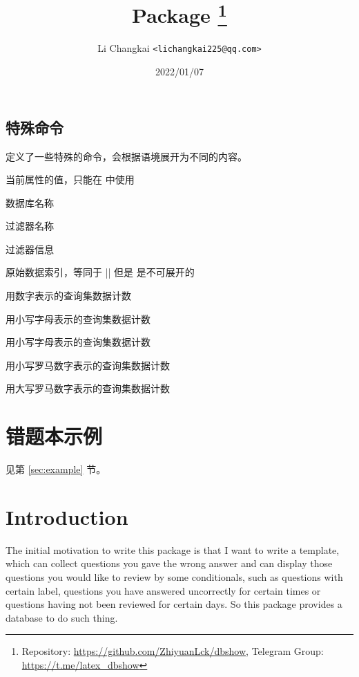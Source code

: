 \documentclass[full]{l3doc}
\begin{document}
\begin{documentation}
\subsection{特殊命令}

 定义了一些特殊的命令，会根据语境展开为不同的内容。

\DescribeMacro{\dbval}当前属性的值，只能在  中使用

\DescribeMacro{\dbDatabase}数据库名称

\DescribeMacro{\dbFilterName}过滤器名称

\DescribeMacro{\dbFilterInfo}过滤器信息

\DescribeMacro{\dbIndex}原始数据索引，等同于 || 但是  是不可展开的

\DescribeMacro{\dbarabic}用数字表示的查询集数据计数

\DescribeMacro{\dbalph}用小写字母表示的查询集数据计数

\DescribeMacro{\dbAlph}用小写字母表示的查询集数据计数

\DescribeMacro{\dbroman}用小写罗马数字表示的查询集数据计数

\DescribeMacro{\dbRoman}用大写罗马数字表示的查询集数据计数

\section{错题本示例}
见第 \ref{sec:example} 节。

\title{
  Package 
  \protect\footnote{%
    Repository: \url{https://github.com/ZhiyuanLck/dbshow},
    Telegram Group: \url{https://t.me/latex_dbshow}}
}
\author{Li Changkai \texttt{<lichangkai225@qq.com>}}
\date{2022/01/07}
\maketitle

\section{Introduction}

The initial motivation to write this package is that I want to write a
template, which can collect questions you gave the wrong answer and can
display those questions you would like to review by some conditionals, such as
questions with certain label, questions you have answered uncorrectly for
certain times or questions having not been reviewed for certain days. So this
package provides a database to do such thing.


\end{documentation}
\end{document}
